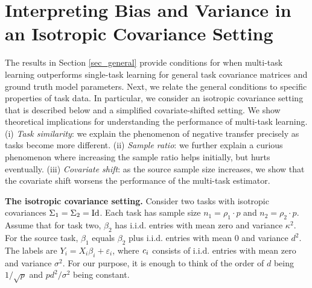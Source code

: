 \section{Interpreting Bias and Variance in an Isotropic Covariance Setting}\label{sec_special}

The results in Section \ref{sec_general} provide conditions for when multi-task learning outperforms single-task learning for general task covariance matrices and ground truth model parameters.
Next, we relate the general conditions to specific properties of task data.
In particular, we consider an isotropic covariance setting that is described below and a simplified covariate-shifted setting.
We show theoretical implications for understanding the performance of multi-task learning.
(i) \textit{Task similarity}: we explain the phenomenon of negative transfer precisely as tasks become more different.
(ii) \textit{Sample ratio}: we further explain a curious phenomenon where increasing the sample ratio helps initially, but hurts eventually.
(iii) \textit{Covariate shift}: as the source sample size increases, we show that the covariate shift worsens the performance of the multi-task estimator.

\smallskip
\noindent\textbf{The isotropic covariance setting.}
	Consider two tasks with isotropic covariances $\Sigma_1 = \Sigma_2 = \operatorname{Id}$.
	Each task has sample size $n_1 = \rho_1 \cdot p$ and $n_2 = \rho_2 \cdot p$.
	Assume that for  task two, $\beta_2$ has i.i.d. entries with mean zero and variance $\kappa^2$.
	For the source task, $\beta_1 $ equals $\beta_2$ plus i.i.d. entries with mean $0$ and variance $d^2$.
	The labels are $Y_i = X_i\beta_i + \varepsilon_i$, where ${\mathit{c}}_i$ consists of i.i.d. entries with mean zero and variance $\sigma^2$.
	For our purpose, it is enough to think of the order of $d$ being $1/\sqrt{p}$ and $pd^2/\sigma^2$ being constant.

